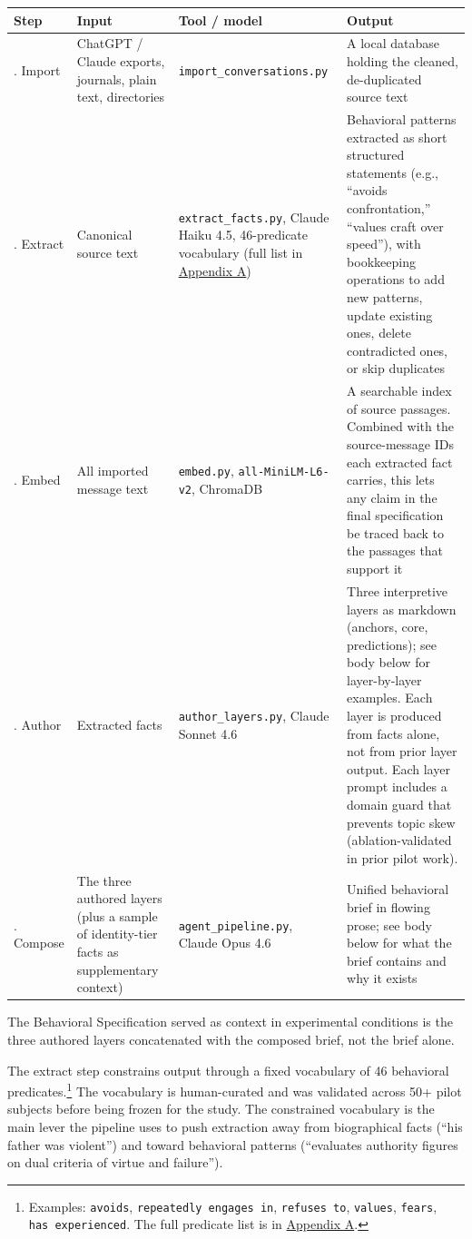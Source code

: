 \begin{longtable}[]{@{}
  >{\raggedright\arraybackslash}p{}
  >{\raggedright\arraybackslash}p{}
  >{\raggedright\arraybackslash}p{}
  >{\raggedright\arraybackslash}p{}@{}}
\toprule
Step & Input & Tool / model & Output \\
\midrule
\endhead
1. Import & ChatGPT / Claude exports, journals, plain text, directories
& \texttt{import\_\allowbreak conversations.py} & A local database
holding the cleaned, de-duplicated source text \\
2. Extract & Canonical source text & \texttt{extract\_facts.py}, Claude
Haiku 4.5, 46-predicate vocabulary (full list in
\protect\hyperlink{appendix-a.-predicate-vocabulary}{Appendix A}) &
Behavioral patterns extracted as short structured statements (e.g.,
``avoids confrontation,'' ``values craft over speed''), with bookkeeping
operations to add new patterns, update existing ones, delete
contradicted ones, or skip duplicates \\
3. Embed & All imported message text & \texttt{embed.py},
\texttt{all-MiniLM-L6-v2}, ChromaDB & A searchable index of source
passages. Combined with the source-message IDs each extracted fact
carries, this lets any claim in the final specification be traced back
to the passages that support it \\
4. Author & Extracted facts & \texttt{author\_layers.py}, Claude Sonnet
4.6 & Three interpretive layers as markdown (anchors, core,
predictions); see body below for layer-by-layer examples. Each layer is
produced from facts alone, not from prior layer output. Each layer
prompt includes a domain guard that prevents topic skew
(ablation-validated in prior pilot work). \\
5. Compose & The three authored layers (plus a sample of identity-tier
facts as supplementary context) & \texttt{agent\_pipeline.py}, Claude
Opus 4.6 & Unified behavioral brief in flowing prose; see body below for
what the brief contains and why it exists \\
\bottomrule
\end{longtable}

The Behavioral Specification served as context in experimental
conditions is the three authored layers concatenated with the composed
brief, not the brief alone.

The extract step constrains output through a fixed vocabulary of 46
behavioral predicates.\footnote{Examples: \texttt{avoids},
  \texttt{repeatedly\ engages\ in}, \texttt{refuses\ to},
  \texttt{values}, \texttt{fears}, \texttt{has\ experienced}. The full
  predicate list is in
  \protect\hyperlink{appendix-a.-predicate-vocabulary}{Appendix A}.} The
vocabulary is human-curated and was validated across 50+ pilot subjects
before being frozen for the study. The constrained vocabulary is the
main lever the pipeline uses to push extraction away from biographical
facts (``his father was violent'') and toward behavioral patterns
(``evaluates authority figures on dual criteria of virtue and
failure'').

